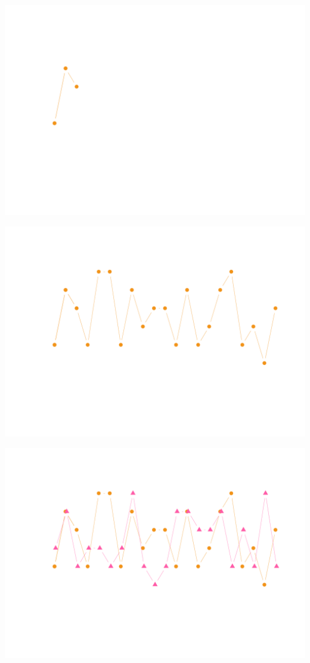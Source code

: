 \documentclass{article}\usepackage[]{graphicx}\usepackage[]{color}
\newenvironment{knitrout}{}{} %
\begin{document}
\begin{knitrout}
\includegraphics[width=\textwidth]{figure/dice1-4} 

\includegraphics[width=\textwidth]{figure/dice1-5} 

\includegraphics[width=\textwidth]{figure/dice1-6} 


\end{knitrout}
\end{document}
